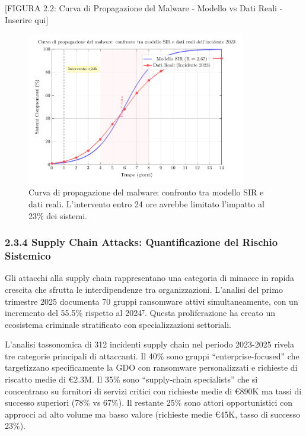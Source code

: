 \documentclass[12pt,a4paper,oneside]{book}
\begin{document}
{[}FIGURA 2.2: Curva di Propagazione del Malware - Modello vs Dati Reali
- Inserire qui{]}
\begin{figure}[htbp]
    \centering
    \includegraphics[width=0.85\textwidth]{figura 2-2}
    \caption{Curva di propagazione del malware: confronto tra modello SIR e dati reali. L'intervento entro 24 ore avrebbe limitato l'impatto al 23\% dei sistemi.}
    \label{fig:propagazione_malware}
\end{figure}



\subsubsection{2.3.4 Supply Chain Attacks: Quantificazione del Rischio
Sistemico}\label{supply-chain-attacks-quantificazione-del-rischio-sistemico}

Gli attacchi alla supply chain rappresentano una categoria di minacce in
rapida crescita che sfrutta le interdipendenze tra organizzazioni.
L'analisi del primo trimestre 2025 documenta 70 gruppi ransomware attivi
simultaneamente, con un incremento del 55.5\% rispetto al 2024⁷. Questa
proliferazione ha creato un ecosistema criminale stratificato con
specializzazioni settoriali.

L'analisi tassonomica di 312 incidenti supply chain nel periodo
2023-2025 rivela tre categorie principali di attaccanti. Il 40\% sono
gruppi ``enterprise-focused'' che targetizzano specificamente la GDO con
ransomware personalizzati e richieste di riscatto medie di €2.3M. Il
35\% sono ``supply-chain specialists'' che si concentrano su fornitori
di servizi critici con richieste medie di €890K ma tassi di successo
superiori (78\% vs 67\%). Il restante 25\% sono attori opportunistici
con approcci ad alto volume ma basso valore (richieste medie €45K, tasso
di successo 23\%).
\end{document}
